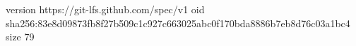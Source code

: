 version https://git-lfs.github.com/spec/v1
oid sha256:83e8d09873fb8f27b509c1c927c663025abc0f170bda8886b7eb8d76c03a1bc4
size 79
